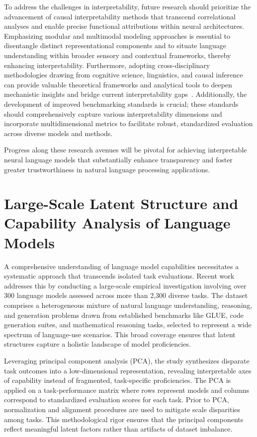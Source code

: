 \documentclass[sigconf]{acmart}
\begin{document}
To address the challenges in interpretability, future research should prioritize the advancement of causal interpretability methods that transcend correlational analyses and enable precise functional attributions within neural architectures. Emphasizing modular and multimodal modeling approaches is essential to disentangle distinct representational components and to situate language understanding within broader sensory and contextual frameworks, thereby enhancing interpretability. Furthermore, adopting cross-disciplinary methodologies drawing from cognitive science, linguistics, and causal inference can provide valuable theoretical frameworks and analytical tools to deepen mechanistic insights and bridge current interpretability gaps~\cite{ref36}. Additionally, the development of improved benchmarking standards is crucial; these standards should comprehensively capture various interpretability dimensions and incorporate multidimensional metrics to facilitate robust, standardized evaluation across diverse models and methods.

Progress along these research avenues will be pivotal for achieving interpretable neural language models that substantially enhance transparency and foster greater trustworthiness in natural language processing applications.

\section{Large-Scale Latent Structure and Capability Analysis of Language Models}

A comprehensive understanding of language model capabilities necessitates a systematic approach that transcends isolated task evaluations. Recent work \cite{ref45} addresses this by conducting a large-scale empirical investigation involving over 300 language models assessed across more than 2,300 diverse tasks. The dataset comprises a heterogeneous mixture of natural language understanding, reasoning, and generation problems drawn from established benchmarks like GLUE, code generation suites, and mathematical reasoning tasks, selected to represent a wide spectrum of language-use scenarios. This broad coverage ensures that latent structures capture a holistic landscape of model proficiencies.

Leveraging principal component analysis (PCA), the study synthesizes disparate task outcomes into a low-dimensional representation, revealing interpretable axes of capability instead of fragmented, task-specific proficiencies. The PCA is applied on a task-performance matrix where rows represent models and columns correspond to standardized evaluation scores for each task. Prior to PCA, normalization and alignment procedures are used to mitigate scale disparities among tasks. This methodological rigor ensures that the principal components reflect meaningful latent factors rather than artifacts of dataset imbalance.
\end{document}
